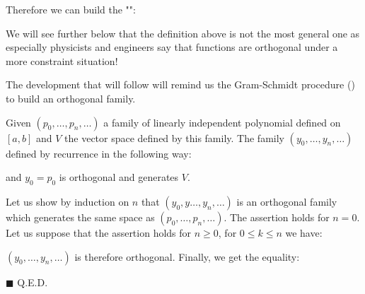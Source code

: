 	Therefore we can build the "":
	
	\begin{tcolorbox}[title=Remark,arc=10pt,breakable,drop lifted shadow,
  skin=enhanced,
  skin first is subskin of={enhancedfirst}{arc=10pt,no shadow},
  skin middle is subskin of={enhancedmiddle}{arc=10pt,no shadow},
  skin last is subskin of={enhancedlast}{drop lifted shadow}]
	We will see further below that the definition above is not the most general one as especially physicists and engineers say that functions are orthogonal under a more constraint situation!
	\end{tcolorbox}
	The development that will follow will remind us the Gram-Schmidt procedure () to build an orthogonal family.
	
	\begin{theorem}
	Given $(p_0,\ldots ,p_n,\ldots )$ a family of linearly independent polynomial defined on $[a,b]$ and $V$ the vector space defined by this family. The family $(y_0,\ldots ,y_n,\ldots )$ defined by recurrence in the following way:
	
	and $y_0=p_0$ is orthogonal and generates $V$.
	\end{theorem}
	\begin{dem}
	Let us show by induction on $n$ that $(y_0,y\ldots ,y_n,\ldots )$ is an orthogonal family which generates the same space as $(p_0,\ldots ,p_n,\ldots )$. The assertion holds for $n=0$. Let us suppose that the assertion holds for $n\geq 0$, for $0\leq k\leq n$ we have:
	
	$(y_0,\ldots ,y_n,\ldots )$ is therefore orthogonal. Finally, we get the equality:	
	
	\begin{flushright}
		$\blacksquare$  Q.E.D.
	\end{flushright}
	\end{dem}
	
